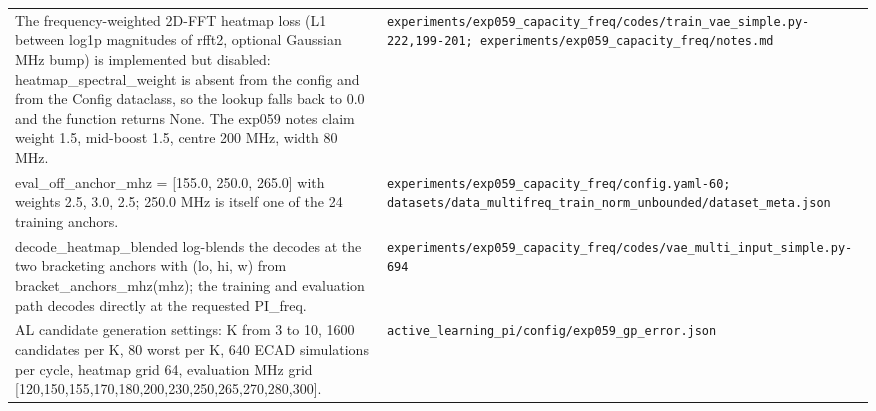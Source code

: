 \begin{longtable}{p{} p{}}
The frequency-weighted 2D-FFT heatmap loss (L1 between log1p magnitudes of rfft2, optional Gaussian MHz bump) is implemented but disabled: heatmap\_spectral\_weight is absent from the config and from the Config dataclass, so the lookup falls back to 0.0 and the function returns None. The exp059 notes claim weight 1.5, mid-boost 1.5, centre 200 MHz, width 80 MHz. & \texttt{experiments/\allowbreak{}exp059\_\allowbreak{}capacity\_\allowbreak{}freq/\allowbreak{}codes/\allowbreak{}train\_\allowbreak{}vae\_\allowbreak{}simple.py-222,199-201; experiments/\allowbreak{}exp059\_\allowbreak{}capacity\_\allowbreak{}freq/\allowbreak{}notes.md} \\
eval\_off\_anchor\_mhz = [155.0, 250.0, 265.0] with weights 2.5, 3.0, 2.5; 250.0 MHz is itself one of the 24 training anchors. & \texttt{experiments/\allowbreak{}exp059\_\allowbreak{}capacity\_\allowbreak{}freq/\allowbreak{}config.yaml-60; datasets/\allowbreak{}data\_\allowbreak{}multifreq\_\allowbreak{}train\_\allowbreak{}norm\_\allowbreak{}unbounded/\allowbreak{}dataset\_\allowbreak{}meta.json} \\
decode\_heatmap\_blended log-blends the decodes at the two bracketing anchors with (lo, hi, w) from bracket\_anchors\_mhz(mhz); the training and evaluation path decodes directly at the requested PI\_freq. & \texttt{experiments/\allowbreak{}exp059\_\allowbreak{}capacity\_\allowbreak{}freq/\allowbreak{}codes/\allowbreak{}vae\_\allowbreak{}multi\_\allowbreak{}input\_\allowbreak{}simple.py-694} \\
AL candidate generation settings: K from 3 to 10, 1600 candidates per K, 80 worst per K, 640 ECAD simulations per cycle, heatmap grid 64, evaluation MHz grid [120,150,155,170,180,200,230,250,265,270,280,300]. & \texttt{active\_\allowbreak{}learning\_\allowbreak{}pi/\allowbreak{}config/\allowbreak{}exp059\_\allowbreak{}gp\_\allowbreak{}error.json} \\
\hline
\end{longtable}
\endgroup

